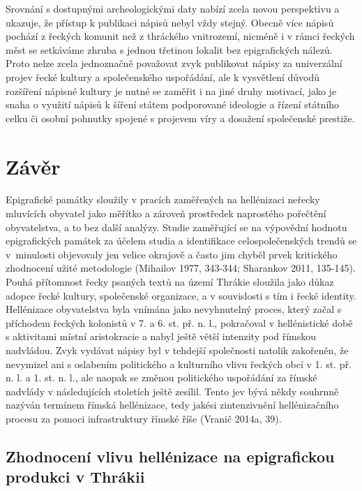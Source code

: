 Srovnání s dostupnými archeologickými daty nabízí zcela novou perspektivu a ukazuje, že přístup k publikaci nápisů nebyl vždy stejný. Obecně více nápisů pochází z řeckých komunit než z thráckého vnitrozemí, nicméně i v rámci řeckých měst se setkáváme zhruba s jednou třetinou lokalit bez epigrafických nálezů. Proto nelze zcela jednoznačně považovat zvyk publikovat nápisy za univerzální projev řecké kultury a společenského uspořádání, ale k vysvětlení důvodů rozšíření nápisné kultury je nutné se zaměřit i na jiné druhy motivací, jako je snaha o využití nápisů k šíření státem podporované ideologie a řízení státního celku či osobní pohnutky spojené s projevem víry a dosažení společenské prestiže.

\chapter{Závěr}
Epigrafické památky sloužily v pracích zaměřených na hellénizaci neřecky mluvících obyvatel jako měřítko a zároveň prostředek naprostého pořečtění obyvatelstva, a to bez další analýzy. Studie zaměřující se na výpovědní hodnotu epigrafických památek za účelem studia a identifikace celospolečenských trendů se v~minulosti objevovaly jen velice okrajově a často jim chyběl prvek kritického zhodnocení užité metodologie (Mihailov 1977, 343-344; Sharankov 2011, 135-145). Pouhá přítomnost řecky psaných textů na území Thrákie sloužila jako důkaz adopce řecké kultury, společenské organizace, a v souvislosti s tím i řecké identity. Hellénizace obyvatelstva byla vnímána jako nevyhnutelný proces, který začal s příchodem řeckých kolonistů v 7. a 6. st. př. n. l., pokračoval v hellénistické době s aktivitami místní aristokracie a nabyl ještě větší intenzity pod římskou nadvládou. Zvyk vydávat nápisy byl v tehdejší společnosti natolik zakořeněn, že nevymizel ani s oslabením politického a kulturního vlivu řeckých obcí v 1. st. př. n. l. a 1. st. n. l., ale naopak se změnou politického uspořádání za římské nadvlády v následujících stoletích ještě zesílil. Tento jev bývá někdy souhrnně nazýván termínem římská hellénizace, tedy jakési zintenzivnění hellénizačního procesu za pomoci infrastruktury římské říše (Vranič 2014a, 39).

\section[zhodnocení-vlivu-hellénizace-na-epigrafickou-produkci-v-thrákii]{Zhodnocení vlivu hellénizace na epigrafickou produkci v Thrákii}

